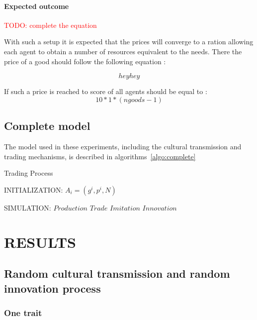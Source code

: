 \documentclass{wscpaperproc}
\newcommand{\memo}[2]{\textcolor{#1}{#2}}
\newcommand{\todo}[1]{\memo{red}{TODO: #1\\}}
\begin{document}
\paragraph{Expected outcome} 

\todo{complete the equation}

With such a setup it is expected that the prices will converge to a ration allowing each agent to obtain a number of resources equivalent to the needs. There the price of a good should follow the following equation :

$$ hey hey $$

If such a price is reached to score of all agents should be equal to : $$ 10*1*(ngoods-1) $$


\subsection{Complete model}

The model used in these experiments, including the cultural transmission and trading mechanisms, is described in algorithms~\ref{algo:complete}

\begin{algorithm}
\caption{Trading Process}
\label{algo:complete}
	\begin{algorithmic}[1]
	\scriptsize
	\State INITIALIZATION: 
				\State $A_i = (g^i,p^i, N)$ 
			\EndFor
		\EndFor

	\State SIMULATION:
				\State $Production$
				\State $Trade$				
					\State $Imitation$
					\State $Innovation$
				\EndIf
			\EndFor
		\EndLoop
\end{algorithmic}
\end{algorithm}


\section{RESULTS}
\subsection{Random cultural transmission and random innovation process}
\subsubsection{One trait}
\end{document}
